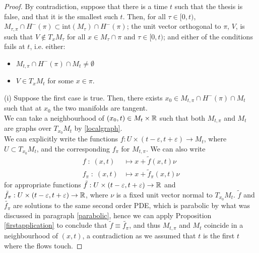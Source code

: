 \begin{proof}
	By contradiction, suppose that there is a time $t$ such that the thesis is false, and that it is the smallest such $t$. Then, for all $\tau \in [0,t)$, $M_{\tau,\pi}\cap H^-(\pi)\subset \mathrm{int}(M_{\tau})\cap H^-(\pi)$; the unit vector orthogonal to $\pi$, $V$, is such that $V\notin T_xM_\tau$ for all $x\in M_\tau\cap \pi$ and $\tau \in [0,t)$; and either of the conditions fails at $t$, i.e. either: 
	\begin{itemize}
		\item[(i)] $M_{t,\pi}\cap H^-(\pi)\cap M_{t}\neq \emptyset$
		\item[(ii)] $V\in T_xM_t$  for some $x\in\pi$. 
	\end{itemize} 
	
	(i) Suppose the first case is true. Then, there exists $x_0 \in M_{t,\pi}\cap H^-(\pi)\cap M_{t}$ such that at $x_0$ the two manifolds are tangent. \\
	We can take a neighbourhood of $(x_0, t)\in M_{t}\times \mathbb{R}$ such that  both $M_{t,\pi}$ and $M_{t}$ are graphs over $T_{x_0}M_{t}$ by \ref{localgraph}. \\
	We can explicitly write the functions $f:U\times (t-\varepsilon, t+\varepsilon)\rightarrow M_t$, where $U\subset T_{x_0}M_{t}$, and the corresponding $f_\pi$ for $M_{t,\pi}$. 
	We can also write 
	\begin{align*}
		f \; : \; (x, t) &\mapsto x+\tilde{f}(x, t)\nu \\
		f_\pi \; : \; (x, t) &\mapsto x+\tilde{f}_\pi(x, t)\nu 
	\end{align*}
	for appropriate functions $\tilde{f}:U\times (t-\varepsilon, t+\varepsilon)\rightarrow \mathbb{R}$ and $\tilde{f}_\pi:U\times (t-\varepsilon, t+\varepsilon)\rightarrow \mathbb{R}$, where $\nu$ is a fixed unit vector normal to $T_{x_0}M_{t}$.  $\tilde{f}$ and $\tilde{f_\pi}$ are solutions to the same second order PDE, which is parabolic by what was discussed in paragraph \ref{parabolic}, hence we can apply Proposition \ref{firstapplication} to conclude that $\tilde{f}\equiv\tilde{f_\pi}$, and thus $M_{t,\pi}$ and $M_{t}$ coincide in a neighbourhood of $(x, t)$, a contradiction as we assumed that $t$ is the first $t$ where the flows touch.
	

\end{proof}
